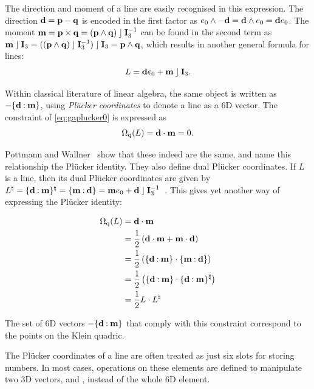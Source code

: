The direction and moment of a line are easily recognised in this expression.  The direction $\mathbf{d} = \mathbf{p} - \mathbf{q}$ is encoded in the first factor as $e_0 \wedge -\mathbf{d} = \mathbf{d} \wedge e_0 = \mathbf{d} e_0$.  
The moment $\mathbf{m} = \mathbf{p} \times \mathbf{q} = (\mathbf{p} \wedge \mathbf{q}) \mathbin{\rfloor} \mathbf{I}_3^{-1}$ can be found in the second term as $\mathbf{m} \mathbin{\rfloor} \mathbf{I}_3 = ((\mathbf{p} \wedge \mathbf{q}) \mathbin{\rfloor} \mathbf{I}_3^{-1}) \mathbin{\rfloor} \mathbf{I}_3 = \mathbf{p} \wedge \mathbf{q}$, which results in another general formula for lines:
\begin{equation*}
  L = \mathbf{d} e_0 + \mathbf{m} \mathbin{\rfloor} \mathbf{I}_3.
\end{equation*}

Within classical literature of linear algebra, the same object is written as $-\{\mathbf{d} \mathbin{:} \mathbf{m}\}$, using \emph{Pl\"ucker coordinates} to denote a line as a 6D vector.  The constraint of \autoref{eq:gaplucker0} is expressed as 
\begin{equation} \label{eq:laplucker0}
  \operatorname{\Omega_q}(L) = \mathbf{d} \mathbin{\cdot} \mathbf{m} = 0 .
\end{equation}

Pottmann and Wallner~\cite[Lemma 2.1.2]{Pottmann} show that these indeed are the same, and name this relationship the Pl\"ucker identity.  They also define dual Pl\"ucker coordinates.  If $L$ is a line, then its dual Pl\"ucker coordinates are given by $L^\natural = \{\mathbf{d} \mathbin{:} \mathbf{m}\}^\natural = \{\mathbf{m} \mathbin{:} \mathbf{d}\} = \mathbf{m} e_0 + \mathbf{d} \mathbin{\rfloor} \mathbf{I}_3^{-1}$~\cite[Lemma 2.1.4]{Pottmann}.  This gives yet another way of expressing the Pl\"ucker identity:

\begin{align*}
  \operatorname{\Omega_q}(L) &= \mathbf{d} \mathbin{\cdot} \mathbf{m} \\
  &= \frac{1}{2} \left( \mathbf{d} \mathbin{\cdot} \mathbf{m} + \mathbf{m} \mathbin{\cdot} \mathbf{d} \right) \\
  &= \frac{1}{2} \left( \{\mathbf{d} \mathbin{:} \mathbf{m}\} \mathbin{\cdot} \{\mathbf{m} \mathbin{:} \mathbf{d}\} \right) \\
  &= \frac{1}{2} \left( \{\mathbf{d} \mathbin{:} \mathbf{m}\} \mathbin{\cdot} \{\mathbf{d} \mathbin{:} \mathbf{m}\}^\natural \right) \\
  &= \frac{1}{2} L \cdot L^\natural \\
\end{align*}

The set of 6D vectors $-\{\mathbf{d} \mathbin{:} \mathbf{m}\}$ that comply with this constraint correspond to the points on the Klein quadric.

The Pl\"ucker coordinates of a line are often treated as just six slots for storing numbers.  In most cases, operations on these elements are defined to manipulate two 3D vectors,  and , instead of the whole 6D element.  

